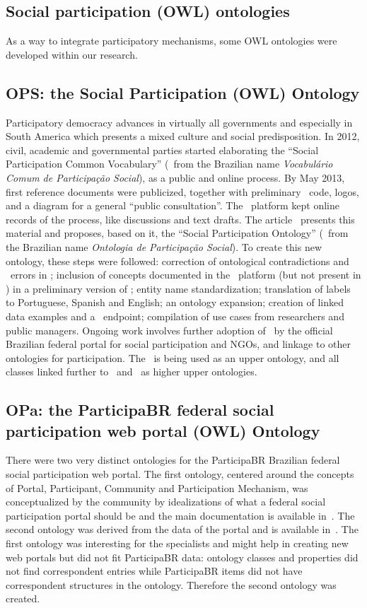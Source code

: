 \begin{apendicesenv}
\section{Social participation (OWL) ontologies}
As a way to integrate participatory mechanisms, some OWL ontologies were developed within our research.

\subsection{OPS: the Social Participation (OWL) Ontology}
Participatory democracy advances in virtually all governments and especially in South America which presents a mixed culture and social predisposition.
 In 2012, civil, academic and governmental parties started elaborating the ``Social Participation Common Vocabulary'' (\vcps\ from the Brazilian name \emph{Vocabul\'ario Comum de Participa\c{c}\~ao Social}), as a public and online process. By May 2013, first reference documents were publicized, together with preliminary \owl\ code, logos, and a diagram for a general ``public consultation''.
The \corais\ platform kept online records of the process, like discussions and text drafts. 
The article~\cite{ops} presents this material and proposes, based on it, the ``Social Participation Ontology'' (\ops\ from the Brazilian name \emph{Ontologia de Participa\c{c}\~ao Social}). To create  this new ontology, these steps were followed: correction of ontological contradictions and \owl\ errors in \vcps; inclusion of concepts documented in the \corais\ platform (but not present in \vcps) in a preliminary version of \ops; entity name standardization; translation of labels to Portuguese, Spanish and English; an ontology expansion; creation of linked data examples and  a \sparql\ endpoint; compilation of use cases from researchers and public managers. Ongoing work involves further adoption of \ops\ by the official Brazilian federal portal for social participation and  NGOs, and linkage to other ontologies for participation. The \ops\ is being used as an upper ontology, and all classes linked further to \foaf\ and \bfo\ as higher upper ontologies.

\subsection{OPa: the ParticipaBR federal social participation web portal (OWL) Ontology}\label{sec:opa}
There were two very distinct ontologies for the ParticipaBR Brazilian federal social participation web portal.
The first ontology, centered around the concepts of Portal, Participant, Community and Participation Mechanism,
was conceptualized by the community by idealizations of what a
federal social participation portal should be and the main documentation is available in~\cite{opa0}.
The second ontology was derived from the data of the portal and is available in~\cite{opa}.
The first ontology was interesting for the specialists and might help in creating new web portals but did not fit
ParticipaBR data: ontology classes and properties did not find correspondent entries while
ParticipaBR items did not have correspondent structures in the ontology.
Therefore the second ontology was created.


\end{apendicesenv}
